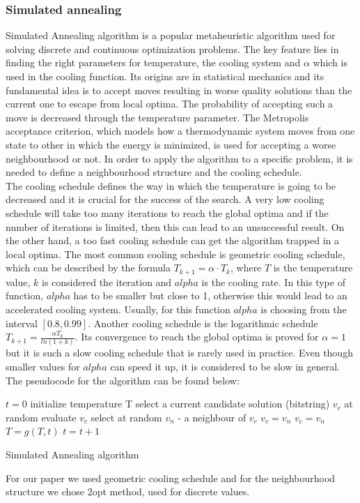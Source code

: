 \documentclass{article}
\begin{document}
\subsubsection{Simulated annealing}
Simulated Annealing algorithm is a popular metaheuristic algorithm used for solving discrete and continuous optimization problems. The key feature lies in finding the right parameters for temperature, the cooling system and $\alpha$ which is used in the cooling function. Its origins are in statistical mechanics and its fundamental idea is to accept moves resulting in worse quality solutions than the current one to escape from local optima. The probability of accepting such a move is decreased through the temperature parameter. The Metropolis acceptance criterion, which models how a thermodynamic system moves from one state to other in which the energy is minimized, is used for accepting a worse neighbourhood or not. In order to apply the algorithm to a specific problem, it is needed to define a neighbourhood structure and the cooling schedule.\\
The cooling schedule defines the way in which the temperature is going to be decreased and it is crucial for the success of the search. A very low cooling schedule will take too many iterations to reach the global optima and if the number of iterations is limited, then this can lead to an unsuccessful result. On the other hand, a too fast cooling schedule can get the algorithm trapped in a local optima. 
The most common cooling schedule is geometric cooling schedule, which can be described by the formula $T_{k+1} = \alpha \cdot T_{k}$, where $T$ is the temperature value, $k$ is considered the iteration and $alpha$ is the cooling rate. In this type of function, $alpha$ has to be smaller but close to 1, otherwise this would lead to an accelerated cooling system. Usually, for this function $alpha$ is choosing from the interval $[0.8, 0.99]$. Another cooling schedule is the logarithmic schedule $T_{k+1} = \frac{\alpha T_k}{ln(1 + k)}$. Its convergence to reach the global optima is proved for $\alpha = 1$ but it is such a slow cooling schedule that is rarely used in practice. Even though smaller values for $alpha$ can speed it up, it is considered to be slow in general.
The pseudocode for the algorithm can be found below:
\begin{algorithm}[H]
\SetAlgoLined
{}
 $t = 0$\;
 initialize temperature T\;
 select a current candidate solution (bitstring) $v_c$ at random\;
 evaluate $v_c$\;
 {
    {
        select at random $v_n$ - a neighbour of $v_c$\;
        {
            $v_c = v_n$\;
        }
        \uElseIf{random([0,1)) $< exp(-\frac{\mid{eval(v_n) - eval(v_c)}\mid}{T})$}
        {
            $v_c = v_n$\;
        }
    }
    $T = g(T,t)$\;
    $t = t + 1$\;
 }
\caption{Simulated Annealing algorithm}
\end{algorithm}
For our paper we used geometric cooling schedule and for the neighbourhood structure we chose 2opt method, used for discrete values.
\end{document}
